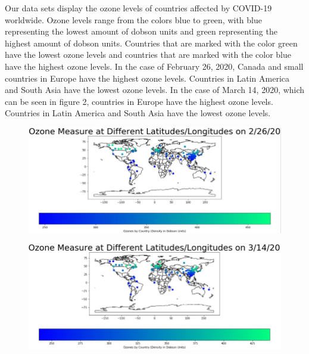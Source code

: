 \documentclass[10pt,journal,compsoc]{IEEEtran}
\begin{document}
{{	 Our data sets display the ozone levels of countries affected by COVID-19 worldwide. Ozone levels range from the colors blue to green, with blue representing the lowest amount of dobson units and green representing the highest amount of dobson units. Countries that are marked with the color green have the lowest ozone levels and countries that are marked with the color blue have the highest ozone levels. In the case of February 26, 2020, Canada and small countries in Europe have the highest ozone levels. Countries in Latin America and South Asia have the lowest ozone levels. In the case of March 14, 2020, which can be seen in figure 2, countries in Europe have the highest ozone levels. Countries in Latin America and South Asia have the lowest ozone levels.

\begin{figure}[!htbp] %
	\includegraphics[scale=0.3]{ozone-feb-26.png}\\ 
	\centering
	\label{LP-COVID-Ozone February 26th}
\end{figure}

\begin{figure}[!htbp] %
	\includegraphics[scale=0.3]{ozone-mar-14.png}\\ 
	\centering
	\label{LP-COVID-Ozone March 14th}
\end{figure}

}}
\end{document}
